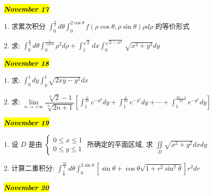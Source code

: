\hl{\textbf{\textit{November 17}}}

1. 求累次积分 $\displaystyle{\int_{0}^{\frac{\pi}{4}}d\theta\int_{0}^{2\cos\theta}f(\rho\cos\theta,\rho\sin\theta)\rho d\rho}$ 的等价形式
\begin{solution}
	
\end{solution}

2. 求: $\displaystyle{\int_{0}^{\frac{\pi}{4}}d\theta\int_{0}^{\frac{1}{\cos\theta}}\rho^2d\rho+\int_{1}^{\sqrt{2}}dx\int_{0}^{\sqrt{2-x^2}}\sqrt{x^2+y^2}dy}$
\begin{solution}
	
\end{solution}

\hl{\textbf{\textit{November 18}}}

1. 求: $\displaystyle{\int_{0}^{1}dy\int_{y}^{1}\sqrt{2xy-y^2}dx}$
\begin{solution}
	
\end{solution}

2. 求: $\displaystyle{\lim\limits_{n\to +\infty}\dfrac{\sqrt[n]{2}-1}{\sqrt[n]{2n+1}}\left[\int_{1}^{\frac{1}{2n}}e^{-y^2}dy+\int_{1}^{\frac{3}{2n}}e^{-y^2}dy+\cdots+\int_{1}^{\frac{2n-1}{2n}}e^{-y^2}dy \right]}$
\begin{solution}
	
\end{solution}

\hl{\textbf{\textit{November 19}}}

1. 设 $D$ 是由 $
\begin{cases}
	0\leq x\leq 1 \\
	0\leq y\leq 1
\end{cases}$ 所确定的平面区域, 求 $\iint\limits_{D}\sqrt{x^2+y^2}dxdy$
\begin{solution}
	
\end{solution}


2. 计算二重积分: $\displaystyle{\int_{\frac{\pi}{4}}^{\frac{3\pi}{4}}d\theta\int_{0}^{2\sin\theta}\left[ \sin\theta+\cos\theta\sqrt{1+r^2\sin^{2}\theta}\right]r^2dr}$
\begin{solution}
	
\end{solution}

\hl{\textbf{\textit{November 20}}}

